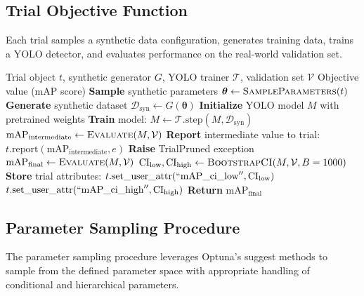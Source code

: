 \subsection{Trial Objective Function}

Each trial samples a synthetic data configuration, generates training data, trains a YOLO detector, and evaluates performance on the real-world validation set.

\begin{algorithm}[H]
\caption{Optuna Trial Objective Function}
\label{alg:optuna_objective}
\begin{algorithmic}[1]
\Require Trial object $t$, synthetic generator $G$, YOLO trainer $\mathcal{T}$, validation set $\mathcal{V}$
\Ensure Objective value (mAP score)
\State \textbf{Sample} synthetic parameters $\boldsymbol{\theta} \gets \Call{SampleParameters}{t}$
\State \textbf{Generate} synthetic dataset $\mathcal{D}_{\text{syn}} \gets G(\boldsymbol{\theta})$
\State \textbf{Initialize} YOLO model $M$ with pretrained weights
    \State \textbf{Train} model: $M \gets \mathcal{T}.\text{step}(M, \mathcal{D}_{\text{syn}})$
        \State $\text{mAP}_{\text{intermediate}} \gets \Call{Evaluate}{M, \mathcal{V}}$
        \State \textbf{Report} intermediate value to trial: $t.\text{report}(\text{mAP}_{\text{intermediate}}, e)$
            \State \textbf{Raise} TrialPruned exception
        \EndIf
    \EndIf
\EndFor
\State $\text{mAP}_{\text{final}} \gets \Call{Evaluate}{M, \mathcal{V}}$
\State $\text{CI}_{\text{low}}, \text{CI}_{\text{high}} \gets \Call{BootstrapCI}{M, \mathcal{V}, B=1000}$
\State \textbf{Store} trial attributes:
\State \hspace{1em} $t.\text{set\_user\_attr}(``\text{mAP\_ci\_low}'', \text{CI}_{\text{low}})$
\State \hspace{1em} $t.\text{set\_user\_attr}(``\text{mAP\_ci\_high}'', \text{CI}_{\text{high}})$
\State \textbf{Return} $\text{mAP}_{\text{final}}$
\end{algorithmic}
\end{algorithm}

\subsection{Parameter Sampling Procedure}

The parameter sampling procedure leverages Optuna's suggest methods to sample from the defined parameter space with appropriate handling of conditional and hierarchical parameters.

